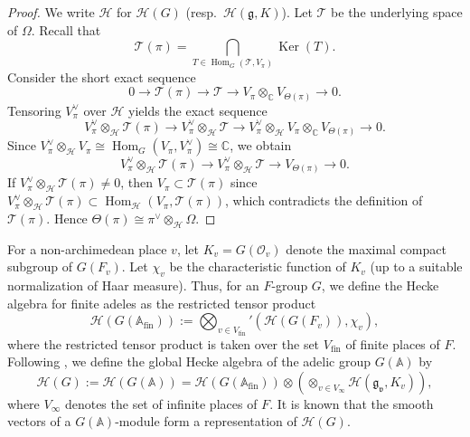 \documentclass[11pt]{article}
\theoremstyle{plain}
\theoremstyle{remark}
\theoremstyle{definition}
\DeclareMathOperator{\Ker}{Ker}
\DeclareMathOperator{\Hom}{Hom}
\DeclareMathOperator{\fin}{fin}
\begin{document}
\begin{proof}
We write $\mathcal{H}$ for $\mathcal{H}(G)$ (resp.\ $\mathcal{H}(\mathfrak{g},K)$).
Let $\mathcal{T}$ be the underlying space of $\Omega$.
Recall that
\[
\mathcal{T}(\pi)=\bigcap_{T\in \Hom_{G}(\mathcal{T},V_{\pi})}\Ker(T).
\]
Consider the short exact sequence
\[
0\to \mathcal{T}(\pi)\to \mathcal{T} \to V_{\pi}\otimes_{\mathbb{C}} V_{\Theta(\pi)}\to 0.
\]
Tensoring $V_{\pi}^{\vee}$ over $\mathcal{H}$ yields the exact sequence
\[
V_{\pi}^{\vee}\otimes_{\mathcal{H}}\mathcal{T}(\pi)\to V_{\pi}^{\vee}\otimes_{\mathcal{H}}\mathcal{T} \to V_{\pi}^{\vee}\otimes_{\mathcal{H}}V_{\pi}\otimes_{\mathbb{C}} V_{\Theta(\pi)}\to 0.
\]
Since $V_{\pi}^{\vee}\otimes_{\mathcal{H}}V_{\pi}\cong \Hom_{G}(V_{\pi},V_{\pi}^{\vee})\cong\mathbb{C}$, we obtain
\[
V_{\pi}^{\vee}\otimes_{\mathcal{H}}\mathcal{T}(\pi)\to V_{\pi}^{\vee}\otimes_{\mathcal{H}}\mathcal{T} \to  V_{\Theta(\pi)}\to 0.
\]
If $V_{\pi}^{\vee}\otimes_{\mathcal{H}}\mathcal{T}(\pi)\neq 0$, then
$V_{\pi}\subset \mathcal{T}(\pi)$ since
$V_{\pi}^{\vee}\otimes_{\mathcal{H}}\mathcal{T}(\pi)\subset \Hom_{\mathcal{H}}(V_{\pi},\mathcal{T}(\pi))$,
which contradicts the definition of $\mathcal{T}(\pi)$.
Hence $\Theta(\pi)\cong\pi^{\vee}\otimes_{\mathcal{H}}\Omega$.
\end{proof}

For a non-archimedean place $v$, let $K_v=G(\mathcal{O}_v)$ denote the maximal compact subgroup of $G(F_v)$.
Let $\chi_v$ be the characteristic function of $K_v$ (up to a suitable normalization of Haar measure).
Thus, for an $F$-group $G$, we define the Hecke algebra for finite adeles as the restricted tensor product
\begin{equation*}
    \mathcal{H}(G(\mathbb{A}_{\fin})):=\bigotimes_{v\in V_{\fin}}{}'(\mathcal{H}(G(F_v)),\chi_v),
\end{equation*}
where the restricted tensor product is taken over the set $V_{\fin}$ of finite places of $F$.
Following \cite[Section~7]{Kn97llds}, we define the global Hecke algebra of the adelic group $G(\mathbb{A})$ by
\begin{equation}\label{egHecke}
\mathcal{H}(G):=\mathcal{H}(G(\mathbb{A}))=\mathcal{H}(G(\mathbb{A}_{\fin}))\otimes\left(\otimes_{v\in V_{\infty}}\mathcal{H}(\mathfrak{g_v},K_v)\right),
\end{equation}
where $V_{\infty}$ denotes the set of infinite places of $F$. 
It is known that the smooth vectors of a $G(\mathbb{A})$-module form a representation of $\mathcal{H}(G)$. 
\end{document}
